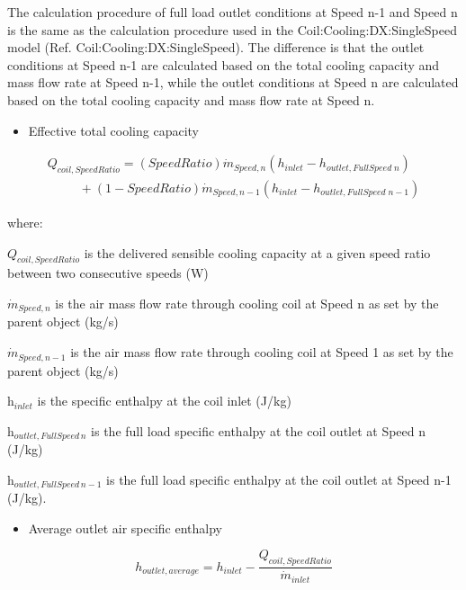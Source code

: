 The calculation procedure of full load outlet conditions at Speed n-1 and Speed n is the same as the calculation procedure used in the Coil:Cooling:DX:SingleSpeed model (Ref. Coil:Cooling:DX:SingleSpeed). The difference is that the outlet conditions at Speed n-1 are calculated based on the total cooling capacity and mass flow rate at Speed n-1, while the outlet conditions at Speed n are calculated based on the total cooling capacity and mass flow rate at Speed n.

\begin{itemize}
  \item Effective total cooling capacity
\end{itemize}

\begin{equation}
\begin{array}{l}
{Q_{coil,SpeedRatio}} = (SpeedRatio){\dot{m}_{Speed,n}}({h_{inlet}} - {h_{outlet,FullSpeed\;n}}) \\
\;\;\;\;\;\;\;\;\; + (1 - SpeedRatio){\dot{m}_{Speed,n-1}}({h_{inlet}} - {h_{outlet,FullSpeed\;n - 1}})
\end{array}
\end{equation}

where:

\({Q_{coil,SpeedRatio}}\) is the delivered sensible cooling capacity at a given speed ratio between two consecutive speeds (W)

\({\dot{m}_{Speed,n}}\) is the air mass flow rate through cooling coil at Speed n as set by the parent object (kg/s)

\({\dot{m}_{Speed,n-1}}\) is the air mass flow rate through cooling coil at Speed 1 as set by the parent object (kg/s)

h\(_{inlet}\) is the specific enthalpy at the coil inlet (J/kg)

h\(_{outlet,FullSpeed\,n}\) is the full load specific enthalpy at the coil outlet at Speed n (J/kg)

h\(_{outlet,FullSpeed\,n-1}\) is the full load specific enthalpy at the coil outlet at Speed n-1 (J/kg).

\begin{itemize}
  \item Average outlet air specific enthalpy
\end{itemize}

\begin{equation}
  {h_{outlet,average}} = {h_{inlet}} - \frac{Q_{coil,SpeedRatio}}{\dot{m}_{inlet}}
\end{equation}

